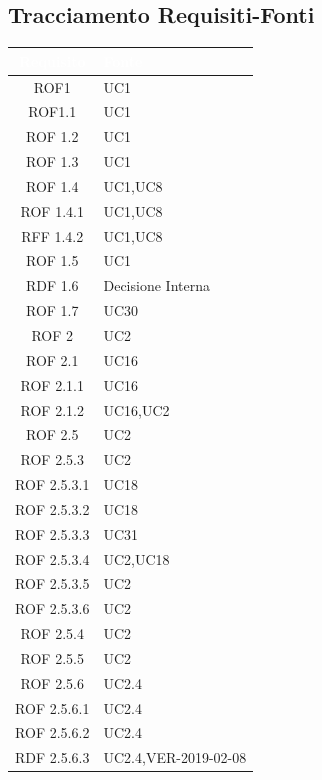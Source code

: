 \subsection{Tracciamento Requisiti-Fonti}\label{TracciamentoRF}
\begin{center}
\begin{longtable}[c]{|c|m{}|}
\hline
\rowcolor{bluelogo}\textbf{\textcolor{white}{Requisito}} & \textbf{\textcolor{white}{Fonte}}\\
\hline \hline
\endhead
ROF1 & UC1 \\
\hline
\rowcolor{grigio}ROF1.1 & UC1 \\
\hline
ROF 1.2 & UC1 \\
\hline
\rowcolor{grigio}ROF 1.3 & UC1 \\
\hline
ROF 1.4 & UC1,UC8 \\
\hline
\rowcolor{grigio}ROF 1.4.1 & UC1,UC8 \\
\hline
RFF 1.4.2 & UC1,UC8 \\
\hline
\rowcolor{grigio}ROF 1.5 & UC1 \\
\hline
RDF 1.6 & Decisione Interna \\
\hline
\rowcolor{grigio}ROF 1.7 & UC30 \\
\hline
ROF 2 & UC2 \\
\hline
\rowcolor{grigio}ROF 2.1 & UC16 \\
\hline
ROF 2.1.1 & UC16 \\
\hline
\rowcolor{grigio}ROF 2.1.2 & UC16,UC2 \\
\hline
ROF 2.5 & UC2 \\
\hline
\rowcolor{grigio}ROF 2.5.3 & UC2 \\
\hline
ROF 2.5.3.1 & UC18 \\
\hline
\rowcolor{grigio}ROF 2.5.3.2 & UC18 \\
\hline
ROF 2.5.3.3 & UC31 \\
\hline
\rowcolor{grigio}ROF 2.5.3.4 & UC2,UC18 \\
\hline
ROF 2.5.3.5 & UC2 \\
\hline
\rowcolor{grigio}ROF 2.5.3.6 & UC2 \\
\hline
ROF 2.5.4 & UC2 \\
\hline
\rowcolor{grigio}ROF 2.5.5 & UC2 \\
\hline
ROF 2.5.6 & UC2.4 \\
\hline
\rowcolor{grigio}ROF 2.5.6.1 & UC2.4 \\
\hline
ROF 2.5.6.2 & UC2.4 \\
\hline
\rowcolor{grigio}RDF 2.5.6.3 & UC2.4,VER-2019-02-08 \\

\end{longtable}
\end{center}
